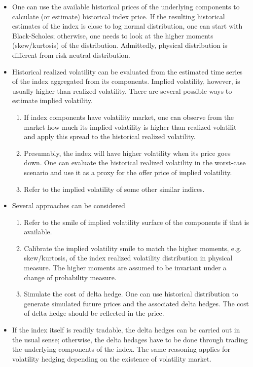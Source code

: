 \documentclass[paper=a4, fontsize=10pt,]{scrartcl} %
\theoremstyle{theorem}
\theoremstyle{remark}
\theoremstyle{example}
\numberwithin{equation}{section} %
\numberwithin{figure}{section} %
\numberwithin{table}{section} %
\begin{document}
\begin{itemize}
\item One can use the available historical prices of the underlying components to calculate (or estimate) historical index price.
If the resulting historical estimates of the index is close to log normal distribution, one can start with Black-Scholes; otherwise, one needs to look at the
higher moments (skew/kurtosis) of the distribution. Admittedly, physical distribution is different from risk neutral distribution.
\item Historical realized volatility can be evaluated from the estimated time series of the index aggregated from its components. Implied volatility, however, is usually higher than realized volatility. There are several possible ways to estimate implied volatility.
\begin{enumerate}
\item If index components have volatility market, one can observe from the market how much its implied
volatility is higher than realized volatilit and apply this spread to the historical realized volatility.
\item Presumably, the index will have higher volatility when its price goes down. One can evaluate the historical realized volatility in the worst-case scenario and use it as a proxy for the offer price of implied volatility.
\item Refer to the implied volatility of some other similar indices.
\end{enumerate}
\item Several approaches can be considered
\begin{enumerate}
\item Refer to the smile of implied volatility surface of the components if that is available.
\item Calibrate the implied
volatility smile to match the higher moments, e.g. skew/kurtosis, of the index realized volatility distribution in physical measure. The higher moments are assumed to be invariant under a change of probability measure.
\item Simulate the cost of delta hedge. One can use historical distribution to
generate simulated future prices and the associated delta hedges. The cost of delta
hedge should be reflected in the price. %
\end{enumerate}
\item If the index itself is readily tradable, the delta hedges can be carried out in the usual sense; otherwise, the delta hedages have to be done through trading the underlying components of the index. The same reasoning applies for volatility hedging depending on the existence of volatility market.
\end{itemize}
\end{document}
